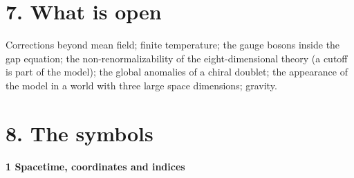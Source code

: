 \documentclass[
  10pt,
]{article}
\begin{document}
\hypertarget{what-is-open}{%
\section{7. What is open}\label{what-is-open}}

Corrections beyond mean field; finite temperature; the gauge bosons
inside the gap equation; the non-renormalizability of the
eight-dimensional theory (a cutoff is part of the model); the global
anomalies of a chiral doublet; the appearance of the model in a world
with three large space dimensions; gravity.

\hypertarget{the-symbols}{%
\section{8. The symbols}\label{the-symbols}}

\textbf{1 Spacetime, coordinates and indices}
\end{document}

